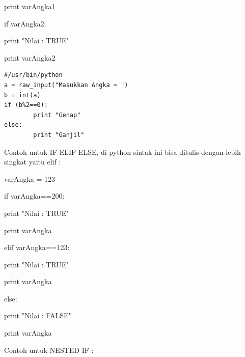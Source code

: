  
                                                print varAngka1 

 
if varAngka2: 

 
                                               print "Nilai : TRUE" 

 
print varAngka2{\fontsize{14pt}{14pt}\selectfont     \\} 

 
\begin{verbatim}
#/usr/bin/python
a = raw_input("Masukkan Angka = ")
b = int(a)
if (b%2==0):
        print "Genap"
else:
        print "Ganjil"
\end{verbatim}

Contoh untuk IF ELIF ELSE, di python sintak ini bisa ditulis dengan lebih singkat yaitu elif :  

 
varAngka = 123 
 
    
 
if varAngka==200: 

 
                           print "Nilai : TRUE" 

 
                           print varAngka 

 
elif varAngka==123: 

 
                           print "Nilai : TRUE" 

 
                           print varAngka 

 
else: 

 
                           print "Nilai : FALSE" 

 
                           print varAngka 

 
Contoh untuk NESTED IF :  

